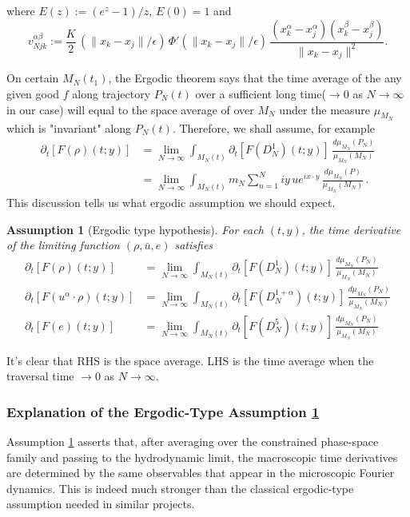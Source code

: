 \documentclass[11pt]{article}
\newtheorem{assumption}{Assumption}
\begin{document}
where $E(z):=(e^z-1)/z,\,E(0)=1$ and
\[
v_{Njk}^{\alpha\beta}
:=\frac{K}{2}\,(\|x_k-x_j\|/\epsilon)\,\Phi'(\|x_k-x_j\|/\epsilon)\,
\frac{(x_k^\alpha-x_j^\alpha)(x_k^\beta-x_j^\beta)}{\|x_k-x_j\|^2}.
\]

On certain $M_N(t_1)$, the Ergodic theorem says that the time average of the any given good $f$ along trajectory $P_N(t)$ over a sufficient long time($\rightarrow0$ as $N\rightarrow\infty$ in our case) will equal to the space average of over $M_N$ under the measure $\mu_{M_N}$ which is "invariant" along $P_N(t)$. Therefore, we shall assume, for example 
\begin{align*}
    \partial_t[F(\rho)(t;y)]&=\lim_{N\rightarrow\infty}\int_{M_N(t)}\partial_t[F(D^1_N)(t;y)]\,\frac{d\mu_{M_N}(P_N)}{\mu_{M_N}(M_N)}\\
    &=\lim_{N\rightarrow\infty}\int_{M_N(t)}m_N\sum_{n=1}^N iy\,ue^{ix\cdot y}\,\frac{d\mu_{M_N}(P)}{\mu_{M_N}(M_N)}\,.
\end{align*}
This discussion tells us what ergodic assumption we should expect.
 
\begin{assumption}[Ergodic type hypothesis]\label{assump:ergodic}
    For each $(t,y)$, the time derivative of the limiting function $(\rho,\bar{u},e)$ satisfies
\begin{align}\label{3.8}
 \partial_t[F(\rho)(t;y)]&=\lim_{N\rightarrow\infty}\int_{M_N(t)}\partial_t[F(D^1_N)(t;y)]\,\frac{d\mu_{M_N}(P_N)}{\mu_{M_N}(M_N)}
\tag{3.8a}\\[4pt]
\partial_t[F(u^\alpha\cdot\rho)(t;y)]&=\lim_{N\rightarrow\infty}\int_{M_N(t)}\partial_t[F(D^{1+\alpha}_N)(t;y)]\,\frac{d\mu_{M_N}(P_N)}{\mu_{M_N}(M_N)}
\tag{3.8b}\\[4pt]
\partial_t[F(e)(t;y)]&=\lim_{N\rightarrow\infty}\int_{M_N(t)}\partial_t[F(D^5_N)(t;y)]\,\frac{d\mu_{M_N}(P_N)}{\mu_{M_N}(M_N)}\tag{3.8c} 
\end{align}
\end{assumption}


It's clear that RHS is the space average. LHS is the time average when the traversal time $\rightarrow0$ as $N\rightarrow\infty$.


\subsubsection{Explanation of the Ergodic-Type Assumption \ref{assump:ergodic}}
Assumption \ref{assump:ergodic} asserts that, after averaging over the constrained phase-space family and passing to the hydrodynamic limit, the macroscopic time derivatives are determined by the same observables that appear in the microscopic Fourier dynamics. This is indeed much stronger than the classical ergodic-type assumption needed in similar projects.\cite{Khinchin1949}
\end{document}
